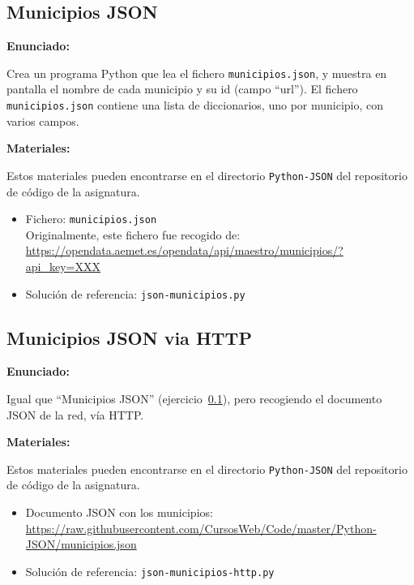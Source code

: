 \subsection{Municipios JSON}
\label{subsec:json-municipios}

\textbf{Enunciado:}

Crea un programa Python que lea el fichero \verb|municipios.json|,
y muestra en pantalla el nombre de cada municipio y su id (campo ``url'').
El fichero \verb|municipios.json| contiene una lista de diccionarios,
uno por municipio, con varios campos.

\textbf{Materiales:}

Estos materiales pueden encontrarse en el
directorio \verb|Python-JSON| del repositorio de código de la
asignatura. 

\begin{itemize}
\item Fichero: \verb|municipios.json| \\
  Originalmente, este fichero fue recogido de: \\
  \url{https://opendata.aemet.es/opendata/api/maestro/municipios/?api_key=XXX}
\item Solución de referencia: \verb|json-municipios.py|
\end{itemize}

\subsection{Municipios JSON via HTTP}
\label{subsec:json-municipios-http}

\textbf{Enunciado:}

Igual que ``Municipios JSON'' (ejercicio~\ref{subsec:json-municipios}),
pero recogiendo el documento JSON de la red, vía HTTP.

\textbf{Materiales:}

Estos materiales pueden encontrarse en el
directorio \verb|Python-JSON| del repositorio de código de la
asignatura. 

\begin{itemize}
\item Documento JSON con los municipios: \\
  \url{https://raw.githubusercontent.com/CursosWeb/Code/master/Python-JSON/municipios.json}
\item Solución de referencia: \verb|json-municipios-http.py|
\end{itemize}


